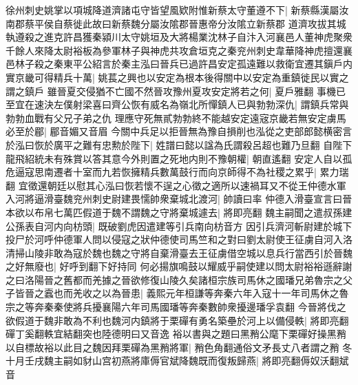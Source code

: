 徐州刺史姚掌以項城降道濟諸屯守皆望風欵附惟新蔡太守董遵不下|{
	新蔡縣漢屬汝南郡蔡平侯自蔡徙此故曰新蔡魏分屬汝隂郡晉惠帝分汝隂立新蔡郡}
道濟攻拔其城執遵殺之進克許昌獲秦潁川太守姚垣及大將楊業沈林子自汴入河襄邑人董神虎聚衆千餘人來降太尉裕板為參軍林子與神虎共攻倉垣克之秦兖州刺史韋華降神虎擅還襄邑林子殺之秦東平公紹言於秦主泓曰晉兵已過許昌安定孤遠難以救衛宜遷其鎭戶内實京畿可得精兵十萬|{
	姚萇之興也以安定為根本後得關中以安定為重鎮徙民以實之謂之鎮戶}
雖晉夏交侵猶不亡國不然晉攻豫州夏攻安定將若之何|{
	夏戶雅翻}
事機已至宜在速決左僕射梁喜曰齊公恢有威名為嶺北所憚鎮人已與勃勃深仇|{
	謂鎮兵常與勃勃血戰有父兄子弟之仇}
理應守死無貳勃勃終不能越安定遠宼京畿若無安定虜馬必至於郿|{
	郿音媚又音眉}
今關中兵足以拒晉無為豫自損削也泓從之吏部郎懿横密言於泓曰恢於廣平之難有忠勲於陛下|{
	姓譜曰懿以諡為氏謂殺呂超也難乃旦翻}
自陛下龍飛紹統未有殊賞以答其意今外則置之死地内則不豫朝權|{
	朝直遙翻}
安定人自以孤危逼寇思南遷者十室而九若恢擁精兵數萬鼓行而向京師得不為社稷之累乎|{
	累力瑞翻}
宜徵還朝廷以慰其心泓曰恢若懷不逞之心徵之適所以速禍耳又不從王仲德水軍入河將逼滑臺魏兖州刺史尉建畏懦帥衆棄城北渡河|{
	帥讀曰率}
仲德入滑臺宣言曰晉本欲以布帛七萬匹假道于魏不謂魏之守將棄城遽去|{
	將即亮翻}
魏主嗣聞之遣叔孫建公孫表自河内向枋頭|{
	既破劉虎因遣建等引兵南向枋音方}
因引兵濟河斬尉建於城下投尸於河呼仲德軍人問以侵寇之狀仲德使司馬竺和之對曰劉太尉使王征虜自河入洛清掃山陵非敢為寇於魏也魏之守將自棄滑臺去王征虜借空城以息兵行當西引於晉魏之好無廢也|{
	好呼到翻下好持同}
何必揚旗鳴鼓以耀威乎嗣使建以問太尉裕裕遜辭謝之曰洛陽晉之舊都而羌據之晉欲修復山陵久矣諸桓宗族司馬休之國璠兄弟魯宗之父子皆晉之蠧也而羌收之以為晉患|{
	義熙元年桓謙等奔秦六年入寇十一年司馬休之魯宗之等奔秦秦使將兵擾襄陽六年司馬國璠等奔秦數帥衆擾邊璠孚袁翻}
今晉將伐之欲假道于魏非敢為不利也魏河内鎮將于栗磾有勇名築壘於河上以備侵軼|{
	將即亮翻磾丁奚翻軼宜結翻突也陸德明曰又音逸}
裕以書與之題曰黑矟公麾下栗磾好操黑矟以自標故裕以此目之魏因拜栗磾為黑矟將軍|{
	矟色角翻通俗文矛長丈八者謂之矟}
冬十月壬戌魏主嗣如豺山宫初燕將庫傉官斌降魏既而復叛歸燕|{
	將即亮翻傉奴沃翻斌音}


